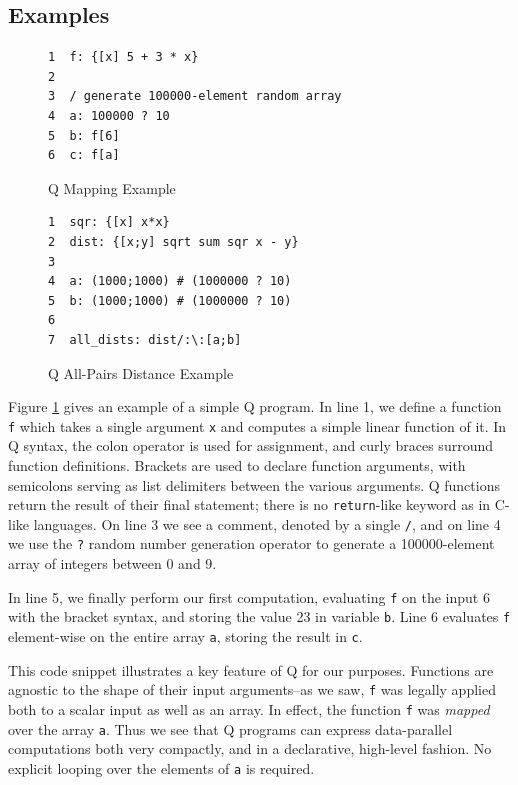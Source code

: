 \documentclass[preprint]{sigplanconf}
\begin{document}
\subsection{Examples}
\begin{figure}
\begin{verbatim}
1  f: {[x] 5 + 3 * x}
2  
3  / generate 100000-element random array
4  a: 100000 ? 10
5  b: f[6]
6  c: f[a]
\end{verbatim}
\caption{Q Mapping Example}
\label{QMap}
\end{figure}

\begin{figure}
\begin{verbatim}
1  sqr: {[x] x*x}
2  dist: {[x;y] sqrt sum sqr x - y}
3  
4  a: (1000;1000) # (1000000 ? 10)
5  b: (1000;1000) # (1000000 ? 10)
6  
7  all_dists: dist/:\:[a;b]
\end{verbatim}
\caption{Q All-Pairs Distance Example}
\label{QAllPairsDist}
\end{figure}

Figure \ref{QMap} gives an example of a simple Q program.  In line 1, we define a function \texttt{f} which takes a single argument \texttt{x} and computes a simple linear function of it.  In Q syntax, the colon operator is used for assignment, and curly braces surround function definitions.  Brackets are used to declare function arguments, with semicolons serving as list delimiters between the various arguments.  Q functions return the result of their final statement; there is no \texttt{return}-like keyword as in C-like languages.  On line 3 we see a comment, denoted by a single \texttt{/}, and on line 4 we use the \texttt{?} random number generation operator to generate a 100000-element array of integers between 0 and 9.

In line 5, we finally perform our first computation, evaluating \texttt{f} on the input 6 with the bracket syntax, and storing the value 23 in variable \texttt{b}.  Line 6 evaluates \texttt{f} element-wise on the entire array \texttt{a}, storing the result in \texttt{c}.

This code snippet illustrates a key feature of Q for our purposes.  Functions are agnostic to the shape of their input arguments--as we saw, \texttt{f} was legally applied both to a scalar input as well as an array.  In effect, the function \texttt{f} was {\it mapped} over the array \texttt{a}.  Thus we see that Q programs can express data-parallel computations both very compactly, and in a declarative, high-level fashion.  No explicit looping over the elements of \texttt{a} is required.
\end{document}
